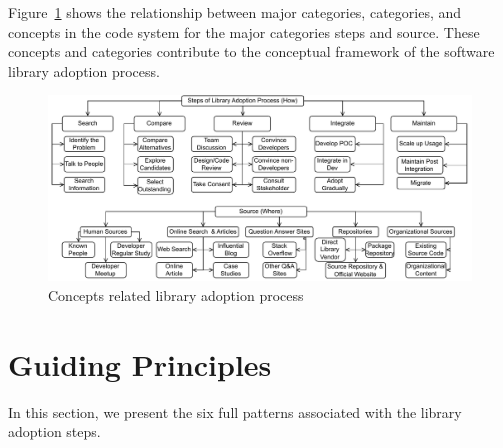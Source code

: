 Figure~\ref{fig:process} shows the relationship between major categories, categories, and concepts in the code system for the major categories steps and source. These concepts and categories contribute to the conceptual framework of the software library adoption process.

\begin{figure}
    \centering
    \includegraphics[scale=0.85]{images/process.pdf}
    \caption{Concepts related library adoption process}
    \label{fig:process}
\end{figure}


\section{Guiding Principles}
In this section, we present the six full patterns associated with the library adoption steps.

\FloatBarrier






